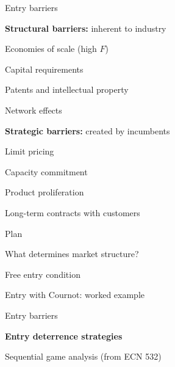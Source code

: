 \documentclass[notes,11pt, aspectratio=169]{beamer}
\newenvironment{wideitemize}{\itemize\addtolength{\itemsep}{10pt}}{\enditemize}
\newenvironment{wideenumerate}{\enumerate\addtolength{\itemsep}{10pt}}{\endenumerate}
\begin{document}
\begin{frame}{Entry barriers}
	\begin{wideitemize}
		\item \textbf{Structural barriers:} inherent to industry
		\begin{wideitemize}
			\vspace{5pt}
			\item Economies of scale (high $F$)
			\item Capital requirements
			\item Patents and intellectual property
			\item Network effects
		\end{wideitemize}
		\item \textbf{Strategic barriers:} created by incumbents
		\begin{wideitemize}
			\vspace{5pt}
			\item Limit pricing
			\item Capacity commitment
			\item Product proliferation
			\item Long-term contracts with customers
		\end{wideitemize}
	\end{wideitemize}
\end{frame}

\begin{frame}{Plan}
  \begin{wideenumerate}
    \item What determines market structure?
    \item Free entry condition
    \item Entry with Cournot: worked example
    \item Entry barriers
    \item \textbf{Entry deterrence strategies}
    \item Sequential game analysis (from ECN 532)
  \end{wideenumerate}
\end{frame}
\end{document}
